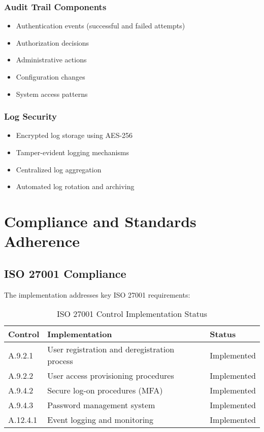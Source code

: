 \documentclass[12pt,a4paper]{article}
\begin{document}
\subsubsection{Audit Trail Components}
\begin{itemize}
    \item Authentication events (successful and failed attempts)
    \item Authorization decisions
    \item Administrative actions
    \item Configuration changes
    \item System access patterns
\end{itemize}

\subsubsection{Log Security}
\begin{itemize}
    \item Encrypted log storage using AES-256
    \item Tamper-evident logging mechanisms
    \item Centralized log aggregation
    \item Automated log rotation and archiving
\end{itemize}

\section{Compliance and Standards Adherence}

\subsection{ISO 27001 Compliance}
The implementation addresses key ISO 27001 requirements:

\begin{table}[H]
\centering
\begin{tabular}{|l|p{8cm}|l|}
\hline
\textbf{Control} & \textbf{Implementation} & \textbf{Status} \\
\hline
A.9.2.1 & User registration and deregistration process & Implemented \\
\hline
A.9.2.2 & User access provisioning procedures & Implemented \\
\hline
A.9.4.2 & Secure log-on procedures (MFA) & Implemented \\
\hline
A.9.4.3 & Password management system & Implemented \\
\hline
A.12.4.1 & Event logging and monitoring & Implemented \\
\hline
\end{tabular}
\caption{ISO 27001 Control Implementation Status}
\label{tab:iso27001}
\end{table}
\end{document}
